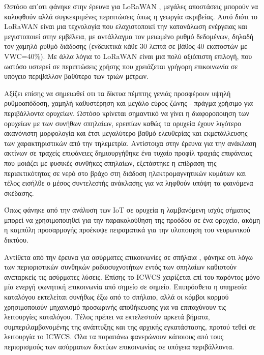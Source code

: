 \documentclass[12pt, greek]{article}
\begin{document}
\begin{multicols*}{2}
        Ωστόσο απ'οτι φάνηκε στην έρευνα για LoRaWAN \cite{zhao_feasibility_2023}, μεγάλες 
        αποστάσεις μπορούν να καλυφθούν αλλά συγκεκριμένες περιπτώσεις όπως η γεωργία ακριβείας.
        Αυτό διότι το LoRaWAN είναι μια τεχνολογία που ελαχιστοποιεί την κατανάλωση ενέργειας και
        μεγιστοποιεί στην εμβέλεια, με αντάλλαγμα τον μειωμένο ρυθμό δεδομένων, δηλαδή τον χαμηλό
        ρυθμό διάδοσης (ενδεικτικά κάθε 30 λεπτά σε βάθος 40 εκατοστών με VWC=40\%). Με άλλα
        λόγια το LoRaWAN είναι μια πολύ αξιόπιστη επιλογή, που ωστόσο υστερεί σε περιπτώσεις 
        χρήσης που χρειάζεται γρήγορη επικοινωνία σε υπόγειο περιβάλλον βαθύτερο των τριών μέτρων.

        Αξίζει επίσης να σημειωθεί οτι τα δίκτυα πέμπτης γενιάς προσφέρουν υψηλή ρυθμοαπόδοση,
        χαμηλή καθυστέρηση και μεγάλο εύρος ζώνης - πράγμα χρήσιμο για περιβάλλοντα ορυχείων.
        Ωστόσο κρίνεται σημαντικό να γίνει η διαφοροποιηση των ορυχείων με των συνήθων σπηλαίων,
        ερειπίων καθώς τα ορυχεία έχουν λιγότερο ακανόνιστη μορφολογία και έτσι μεγαλύτερο βαθμό
        ελευθερίας και εκμετάλλευσης των χαρακτηριστικών από την τηλεμετρία. Αντίστοιχα στην έρευνα
        για την ανάκλαση ακτίνων σε τραχείς επιφάνειες \cite{soo_investigation_2018} δημιουργήθηκε
        ένα τυχαίο προφίλ τραχιάς επιφάνειας που μοιάζει με φυσικές συνθήκες σπηλαίων, εξετάστηκε
        η επίδραση της περιεκτικότητας σε νερό στο βράχο στη διάδοση ηλεκτρομαγνητικών κυμάτων και
        τέλος εισήλθε ο μέσος συντελεστής ανάκλασης για να ληφθούν υπόψη τα φαινόμενα σκέδασης.

        Όπως φάνηκε από την ανάλυση των IoT σε ορυχεία \cite{ming_study_2019} η λαμβανόμενη ισχύς
        σήματος μπορεί να χρησιμοποιηθεί για την παρακολούθηση της προόδου σε ένα ορυχείο, ακόμη 
        η καμπύλη προσαρμογής προέκυψε πειραματικά για την υλοποιηση του νευρωνικού δικτύου.

        Αντίθετα από την έρευνα για ασύρματες επικοινωνίες σε σπήλαια \cite{yavuz_-cave_2009},
        φάνηκε οτι λόγω των περιοριστικών συνθηκών ραδιοσυχνοτήτων εντός των σπηλαίων καθιστούν
        ανεπαρκείς τις ασύρματες λύσεις. Επίσης το ICWCS χειρίζεται επί του παρόντος μόνο μία
        ενεργή φωνητική επικοινωνία από σημείο σε σημείο. Επιπρόσθετα η υπηρεσία καταλόγου
        εκτελείται συνήθως έξω από το σπήλαιο, αλλά οι κόμβοι κορμού χρησιμοποιούν μηχανισμό
        προσωρινής αποθήκευσης για να επιταχύνουν τις λειτουργίες καταλόγου. Τέλος πρέπει να
        εκτελεστούν αρκετά βήματα, συμπεριλαμβανομένης της ανάπτυξης και της αρχικής εγκατάστασης,
        προτού τεθεί σε λειτουργία το ICWCS. Όλα τα παραπάνω φανερώνουν κάποιους από τους
        περιορισμούς των ασύρματων δικτύων επικοινωνίας σε υπόγεια περιβάλλοντα.


\end{multicols*}
\end{document}
